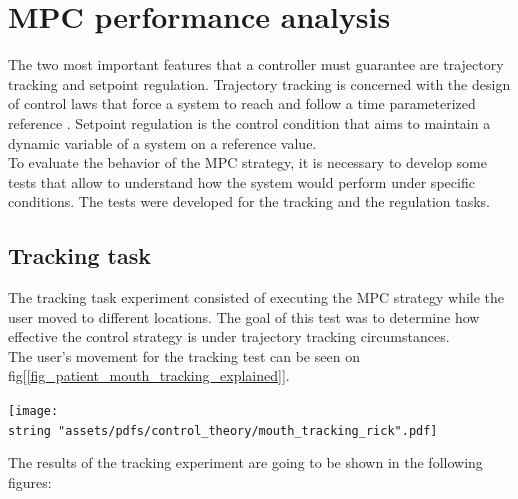\documentclass[11pt]{report} %
\begin{document}
\section{MPC performance analysis}
The two most important features that a controller must guarantee are trajectory tracking and setpoint regulation. Trajectory tracking is concerned with the design of control laws that force a system to reach and follow a time
parameterized reference \citep{cite_trajectory_tracking}. Setpoint regulation is the control condition that aims to maintain a dynamic variable of a system on a reference value. \\

To evaluate the behavior of the MPC strategy, it is necessary to develop some tests that allow to understand how the system would perform under specific conditions. The tests were developed for the tracking and the regulation tasks.\\

\subsection{Tracking task}

The tracking task experiment consisted of executing the MPC strategy while the user moved  to different locations. The goal of this test was to determine how effective the control strategy is under trajectory tracking circumstances. \\

The user's movement for the tracking test can be seen on fig[\ref{fig_patient_mouth_tracking_explained}].

\begin{center}
\texttt{[image: \\string "assets/pdfs/control\_theory/mouth\_tracking\_rick".pdf]}
\bigbreak
\begin{minipage}{\linewidth} %
\label{fig_patient_mouth_tracking_explained}
\end{minipage} \end{center}



The results of the tracking experiment are going to be shown in the following figures:
\end{document}
